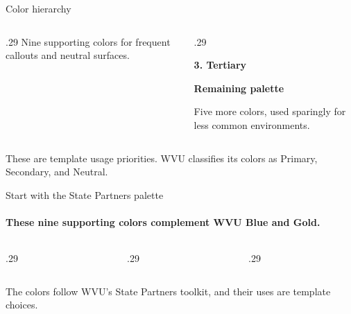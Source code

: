 \begin{frame}{Color hierarchy}
\begin{columns}[T,onlytextwidth]
\begin{column}{.29\textwidth}
      \smallskip
      \small Nine supporting colors for frequent callouts and neutral surfaces.
    \end{column}
    \begin{column}{.29\textwidth}
      \begin{minipage}[t][1.10cm][t]{\linewidth}
        \par
        \par
        \par
      \end{minipage}\par
      \vspace{.12cm}
      {\large\bfseries\color{wvu-blue}3. Tertiary\par}
      \smallskip
      {\bfseries Remaining palette\par}
      \smallskip
      \small Five more colors, used sparingly for less common environments.
    \end{column}
  \end{columns}
  \vspace{.40cm}
  {\small\color{wvu-coal}These are template usage priorities. WVU classifies its colors as Primary, Secondary, and Neutral.}
\end{frame}

\begin{frame}{Start with the State Partners palette}
  \framesubtitle{These nine supporting colors complement WVU Blue and Gold.}
  \begin{columns}[T,onlytextwidth]
    \begin{column}{.29\textwidth}
    \end{column}
    \begin{column}{.29\textwidth}
    \end{column}
    \begin{column}{.29\textwidth}
    \end{column}
  \end{columns}
  \vspace{.08cm}
  {\footnotesize The colors follow WVU's State Partners toolkit, and their uses are template choices.}
\end{frame}

